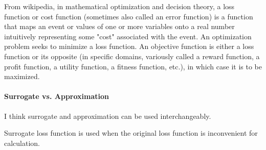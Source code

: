 \documentclass[sutton_barto_notes.tex]{subfiles}
\begin{document}
From wikipedia, in mathematical optimization and decision theory, a loss function or cost function (sometimes also called an error function) is a function that maps an event or values of one or more variables onto a real number intuitively representing some "cost" associated with the event. An optimization problem seeks to minimize a loss function. An objective function is either a loss function or its opposite (in specific domains, variously called a reward function, a profit function, a utility function, a fitness function, etc.), in which case it is to be maximized.

\paragraph{Surrogate vs. Approximation}

I think surrogate and approximation can be used interchangeably.

Surrogate loss function is used when the original loss function is inconvenient for calculation.
\end{document}
